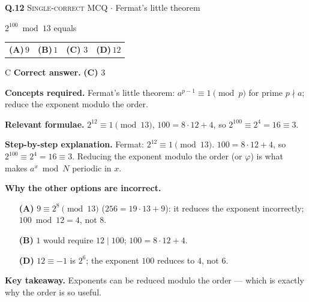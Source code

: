 \documentclass[11pt,a4paper]{article}
\newcommand{\optlabel}[1]{\textbf{(#1)}}
\newcommand{\correctlabel}[1]{\textcolor{okgreen}{\textbf{(#1)}\,\ding{51}}}
\newenvironment{qitem}[1]{\begin{list}{}{\setlength{\leftmargin}{3.3em}\setlength{\labelwidth}{3.1em}%
  \setlength{\labelsep}{0.2em}\setlength{\topsep}{3pt}\setlength{\parsep}{3pt}}\item[\textbf{Q.#1}\hfill]}{\end{list}}
\newcommand{\qsep}{\par\vspace{2pt}{\color{black!15}\hrule}\vspace{4pt}}
\newcommand{\qmeta}[2]{{\footnotesize\color{black!60}\textsc{#1} \;$\cdot$\; #2}\par}
\begin{document}
\begin{qitem}{12}
\qmeta{Single-correct MCQ}{Fermat's little theorem}
$2^{100} \bmod 13$ equals
\par\smallskip\noindent\begin{tabularx}{\linewidth}{@{}*{4}{L}@{}}
\optlabel{A}\,$9$ & \optlabel{B}\,$1$ & \correctlabel{C}\,$3$ & \optlabel{D}\,$12$
\end{tabularx}
\end{qitem}
\begin{solbox}{C}
\textbf{\color{brand}Correct answer.} \textcolor{okgreen}{\textbf{(C)}} $3$

\textbf{\color{brand}Concepts required.} Fermat's little theorem: $a^{p-1} \equiv 1 \pmod p$ for prime $p \nmid a$; reduce the exponent modulo the order.

\textbf{\color{brand}Relevant formulae.} $2^{12} \equiv 1 \pmod{13}$, $100 = 8\cdot12 + 4$, so $2^{100} \equiv 2^4 = 16 \equiv 3$.

\textbf{\color{brand}Step-by-step explanation.} Fermat: $2^{12} \equiv 1 \pmod{13}$. $100 = 8\cdot12 + 4$, so $2^{100} \equiv 2^4 = 16 \equiv 3$. Reducing the exponent modulo the order (or
$\varphi$) is what makes $a^x \bmod N$ periodic in $x$.

\textbf{\color{brand}Why the other options are incorrect.}
\begin{itemize}[leftmargin=2.4em, itemsep=1pt, topsep=2pt]
\item[\textbf{(A)}] $9 \equiv 2^8 \pmod{13}$ ($256 = 19\cdot13 + 9$): it reduces the exponent incorrectly; $100 \bmod 12 = 4$, not $8$.
\item[\textbf{(B)}] $1$ would require $12 \mid 100$; $100 = 8\cdot12 + 4$.
\item[\textbf{(D)}] $12 \equiv -1$ is $2^6$; the exponent $100$ reduces to $4$, not $6$.
\end{itemize}
\textbf{\color{brand}Key takeaway.} Exponents can be reduced modulo the order --- which is exactly why the order is so useful.
\end{solbox}
\qsep
\end{document}
